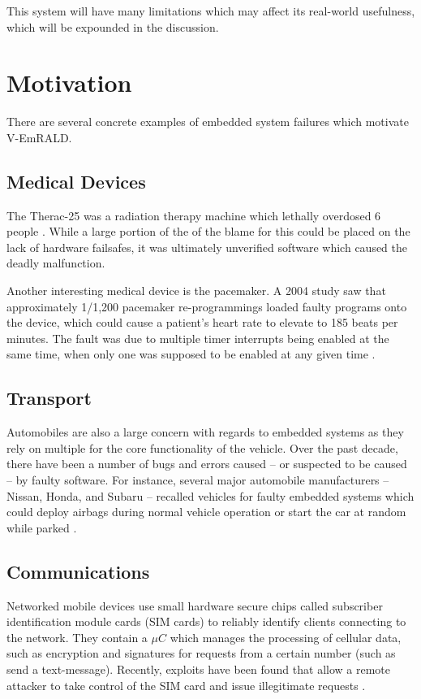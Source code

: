\documentclass[preprint,11pt]{sigplanconf}
\begin{document}
This system will have many limitations which may affect its real-world usefulness,
which will be expounded in the discussion.

\section{Motivation}
There are several concrete examples of embedded system failures which
motivate V-EmRALD.
\subsection{Medical Devices}
The Therac-25 was a radiation therapy machine which lethally overdosed
6 people \cite{therac}. While a large portion of the of the blame for
this could be placed on the lack of hardware failsafes, it was
ultimately unverified software which caused the deadly malfunction.

Another interesting medical device is the pacemaker. A 2004 study saw
that approximately 1/1,200 pacemaker re-programmings loaded faulty
programs onto the device, which could cause a patient's heart rate to
elevate to 185 beats per minutes. The fault was due to multiple
timer interrupts being enabled at the same time, when only one was
supposed to be enabled at any given time \cite{pacemaker}.
\subsection{Transport}
Automobiles are also a large concern with regards to embedded systems
as they rely on multiple for the core functionality of the
vehicle. Over the past decade, there have been a number of
bugs and errors caused -- or suspected to be caused -- by faulty
software.  For instance, several major automobile manufacturers --
Nissan, Honda, and Subaru -- recalled vehicles for faulty embedded
systems which could deploy airbags during normal vehicle operation or
start the car at random while parked \cite{cars}.

\subsection{Communications}
Networked mobile devices use small hardware secure chips called
subscriber identification module cards (SIM cards) to reliably
identify clients connecting to the network. They contain a $\mu C$
which manages the processing of cellular data, such as encryption and
signatures for requests from a certain number (such as send a
text-message). Recently, exploits have been found that allow a remote
attacker to take control of the SIM card and issue illegitimate
requests \cite{sim}.
\end{document}
